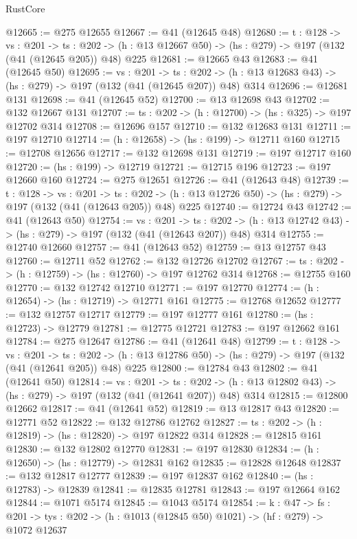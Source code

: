 \begin{lexlean}{RustCore}
\begin{coremodule}
@12665 := @275 @12655
@12667 := @41 (@12645 @48)
@12680 := {t : @128} ->
  {vs : @201} ->
  {ts : @202} -> (h : @13 @12667 @50) -> (hs : @279) -> @197 (@132 (@41 (@12645 @205)) @48) @225
@12681 := @12665 @43
@12683 := @41 (@12645 @50)
@12695 := {vs : @201} ->
  {ts : @202} -> (h : @13 @12683 @43) -> (hs : @279) -> @197 (@132 (@41 (@12645 @207)) @48) @314
@12696 := @12681 @131
@12698 := @41 (@12645 @52)
@12700 := @13 @12698 @43
@12702 := @132 @12667 @131
@12707 := {ts : @202} -> (h : @12700) -> (hs : @325) -> @197 @12702 @314
@12708 := @12696 @157
@12710 := @132 @12683 @131
@12711 := @197 @12710
@12714 := (h : @12658) -> (hs : @199) -> @12711 @160
@12715 := @12708 @12656
@12717 := @132 @12698 @131
@12719 := @197 @12717 @160
@12720 := (hs : @199) -> @12719
@12721 := @12715 @196
@12723 := @197 @12660 @160
@12724 := @275 @12651
@12726 := @41 (@12643 @48)
@12739 := {t : @128} ->
  {vs : @201} ->
  {ts : @202} -> (h : @13 @12726 @50) -> (hs : @279) -> @197 (@132 (@41 (@12643 @205)) @48) @225
@12740 := @12724 @43
@12742 := @41 (@12643 @50)
@12754 := {vs : @201} ->
  {ts : @202} -> (h : @13 @12742 @43) -> (hs : @279) -> @197 (@132 (@41 (@12643 @207)) @48) @314
@12755 := @12740 @12660
@12757 := @41 (@12643 @52)
@12759 := @13 @12757 @43
@12760 := @12711 @52
@12762 := @132 @12726 @12702
@12767 := {ts : @202} -> (h : @12759) -> (hs : @12760) -> @197 @12762 @314
@12768 := @12755 @160
@12770 := @132 @12742 @12710
@12771 := @197 @12770
@12774 := (h : @12654) -> (hs : @12719) -> @12771 @161
@12775 := @12768 @12652
@12777 := @132 @12757 @12717
@12779 := @197 @12777 @161
@12780 := (hs : @12723) -> @12779
@12781 := @12775 @12721
@12783 := @197 @12662 @161
@12784 := @275 @12647
@12786 := @41 (@12641 @48)
@12799 := {t : @128} ->
  {vs : @201} ->
  {ts : @202} -> (h : @13 @12786 @50) -> (hs : @279) -> @197 (@132 (@41 (@12641 @205)) @48) @225
@12800 := @12784 @43
@12802 := @41 (@12641 @50)
@12814 := {vs : @201} ->
  {ts : @202} -> (h : @13 @12802 @43) -> (hs : @279) -> @197 (@132 (@41 (@12641 @207)) @48) @314
@12815 := @12800 @12662
@12817 := @41 (@12641 @52)
@12819 := @13 @12817 @43
@12820 := @12771 @52
@12822 := @132 @12786 @12762
@12827 := {ts : @202} -> (h : @12819) -> (hs : @12820) -> @197 @12822 @314
@12828 := @12815 @161
@12830 := @132 @12802 @12770
@12831 := @197 @12830
@12834 := (h : @12650) -> (hs : @12779) -> @12831 @162
@12835 := @12828 @12648
@12837 := @132 @12817 @12777
@12839 := @197 @12837 @162
@12840 := (hs : @12783) -> @12839
@12841 := @12835 @12781
@12843 := @197 @12664 @162
@12844 := @1071 @5174
@12845 := @1043 @5174
@12854 := {k : @47} ->
  {fs : @201} -> {tys : @202} -> (h : @1013 (@12845 @50) @1021) -> (hf : @279) -> @1072 @12637

\end{coremodule}
\end{lexlean}
